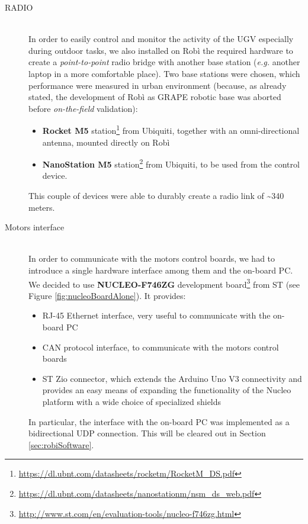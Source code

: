 \begin{description}
	\item[RADIO] \hfill \\ In order to easily control and monitor the activity of the \ac{UGV} especially during outdoor tasks, we also installed on Robì the required hardware to create a \textit{point-to-point} radio bridge with another base station (\textit{e.g.} another laptop in a more comfortable place). Two base stations were chosen, which performance were measured in urban environment (because, as already stated, the development of Robì as \ac{GRAPE} robotic base was aborted before \textit{on-the-field} validation):
	\begin{itemize}
		\item \textbf{Rocket M5} station\footnote{\url{https://dl.ubnt.com/datasheets/rocketm/RocketM_DS.pdf}}
		from Ubiquiti, together with an omni-directional antenna, mounted directly on Robì
		\item \textbf{NanoStation M5} station\footnote{\url{https://dl.ubnt.com/datasheets/nanostationm/nsm_ds_web.pdf}}
		from Ubiquiti, to be used from the control device.
	\end{itemize}
	This couple of devices were able to durably create a radio link of \textasciitilde340 meters.
	
	\item[Motors interface] \hfill \\ In order to communicate with the motors control boards, we had to introduce a single hardware interface among them and the on-board PC. We decided to use \textbf{NUCLEO-F746ZG} development board\footnote{\url{http://www.st.com/en/evaluation-tools/nucleo-f746zg.html}}
	from ST (see Figure \ref{fig:nucleoBoardAlone}). It provides:
	\begin{itemize}
		\item RJ-45 Ethernet interface, very useful to communicate with the on-board PC
		\item CAN protocol interface, to communicate with the motors control boards
		\item ST Zio connector, which extends the Arduino Uno V3 connectivity and provides an easy means of expanding the functionality of the Nucleo platform with a wide choice of specialized shields
	\end{itemize}
	In particular, the interface with the on-board PC was implemented as a bidirectional UDP connection. This will be cleared out in Section \ref{sec:robiSoftware}.
	

\end{description}
